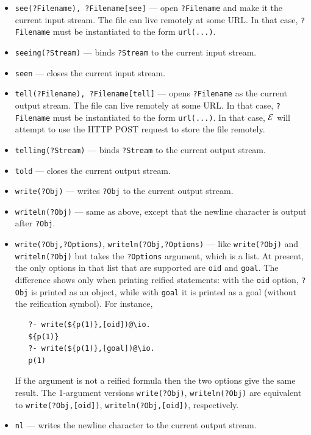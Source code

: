 \documentclass[11pt]{article}
\newcommand{\ERGO}{\mbox{\ensuremath{\cal{E}}\smaller{{\sc{RGO}}}}\xspace}
\newcommand{\FLSYSTEM}{\ERGO}
\begin{document}
\begin{itemize}
\item  {\tt see(?Filename), ?Filename[see]} --- open {\tt ?Filename} and
  make it the current input stream.
  The file can live remotely at some URL. In that case, {\tt ?Filename}
  must be instantiated to the form {\tt url(...)}.  
\item {\tt seeing(?Stream)} --- binds {\tt ?Stream} to the current input
  stream.
\item {\tt seen} --- closes the current input stream.
\item {\tt tell(?Filename), ?Filename[tell]} --- opens {\tt ?Filename} as the current output
  stream. The file can live remotely at some URL. In that case, {\tt ?Filename}
  must be instantiated to the form {\tt url(...)}.
  In that case, \FLSYSTEM will attempt to use the HTTP POST request to store
  the file remotely.
\item {\tt telling(?Stream)} --- binds {\tt ?Stream} to the current output
  stream. 
\item {\tt told} --- closes the current output stream.
\item {\tt write(?Obj)} --- writes {\tt ?Obj} to the current output stream.
\item {\tt writeln(?Obj)} --- same as above,
  except that the newline character is output after {\tt ?Obj}.
\item {\tt write(?Obj,?Options)}, \texttt{writeln(?Obj,?Options)} ---  like
  \texttt{write(?Obj)} and \texttt{writeln(?Obj)} but takes the
  \texttt{?Options} argument, which is a list. At present, the only options
  in that list that are supported are \texttt{oid} and \texttt{goal}.
  The difference shows only when printing reified statements: with the
  \texttt{oid} option, \texttt{?Obj} is printed as an object, while
  with \texttt{goal} it is printed as a goal (without the reification
  symbol). For instance,
\begin{verbatim}
   ?- write(${p(1)},[oid])@\io.
   ${p(1)}
   ?- write(${p(1)},[goal])@\io.
   p(1)
\end{verbatim}
  If the argument is not a reified formula then the two options give the
  same result. The 1-argument versions \texttt{write(?Obj)},
  \texttt{writeln(?Obj)} are equivalent to \texttt{write(?Obj,[oid])},
  \texttt{writeln(?Obj,[oid])}, respectively.
\item {\tt nl} --- writes the newline character to the current output
  stream.

\end{itemize}
\end{document}
